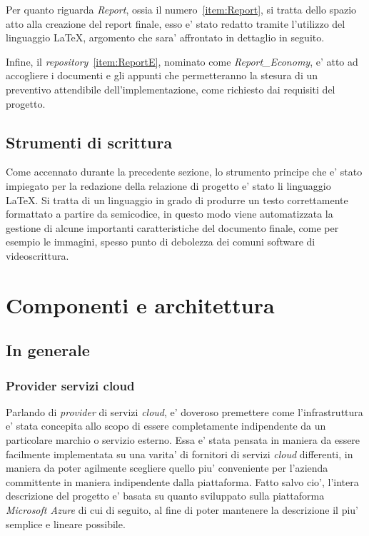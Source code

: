 \documentclass[a4paper]{report}
\begin{document}
		Per quanto riguarda \emph{Report}, ossia il numero~\ref{item:Report}, si tratta dello spazio atto alla creazione
		del report finale, esso e' stato redatto tramite l'utilizzo del linguaggio \LaTeX{}, argomento che sara'
		affrontato in dettaglio in seguito.

		Infine, il \emph{repository}~\ref{item:ReportE}, nominato come \emph{Report\_Economy}, e' atto ad accogliere i
		documenti e gli appunti che permetteranno la stesura di un preventivo attendibile dell'implementazione, come
		richiesto dai requisiti del progetto.
	\section{Strumenti di scrittura}\label{strumenti_di_scrittura}
		Come accennato durante la precedente sezione, lo strumento principe che e' stato impiegato per la redazione
		della relazione di progetto e' stato li linguaggio \LaTeX{}. Si tratta di un linguaggio in grado di produrre un
		testo correttamente formattato a partire da semicodice, in questo modo viene automatizzata la gestione di alcune
		importanti caratteristiche del documento finale, come per esempio le immagini, spesso punto di debolezza dei
		comuni software di videoscrittura.

\chapter{Componenti e architettura}\label{componenti_e_architettura}
	\section{In generale}\label{in_generale}
		\subsection{Provider servizi cloud}\label{provider_servizi_cloud}
			Parlando di \emph{provider} di servizi \emph{cloud}, e' doveroso premettere come l'infrastruttura e' stata
			concepita allo scopo di essere completamente indipendente da un particolare marchio o servizio esterno. Essa
			e' stata pensata in maniera da essere facilmente implementata su una varita' di fornitori di servizi
			\emph{cloud} differenti, in maniera da poter agilmente scegliere quello piu' conveniente per l'azienda
			committente in maniera indipendente dalla piattaforma. Fatto salvo cio', l'intera descrizione del progetto
			e' basata su quanto sviluppato sulla piattaforma \emph{Microsoft Azure} di cui di seguito, al fine di poter
			mantenere la descrizione il piu' semplice e lineare possibile.
\end{document}
